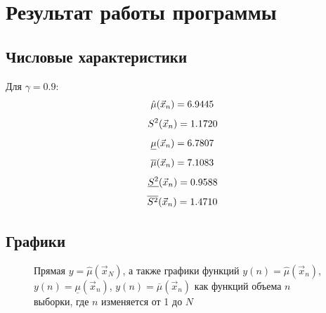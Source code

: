 \section{Результат работы программы}

\subsection{Числовые характеристики}
Для $\gamma = 0.9$:
\begin{equation*}
	\hat\mu(\vec x_n) = 6.9445\\
\end{equation*}
\begin{equation*}
	S^2(\vec x_n) = 1.1720\\
\end{equation*}
\begin{equation*}
	\underline\mu(\vec x_n) = 6.7807\\
\end{equation*}
\begin{equation*}
	\overline\mu(\vec x_n) = 7.1083 \\
\end{equation*}
\begin{equation*}
	\underline{S^2}(\vec x_n) = 0.9588\\
\end{equation*}
\begin{equation*}
	\overline{S^2}(\vec x_n) = 1.4710\\
\end{equation*}

\newpage

\subsection{Графики}

\begin{figure}[!h]
 \caption{Прямая $y = \hat\mu(\vec x_N)$, а также графики функций  $y(n) = \hat\mu(\vec x_n)$, $y(n) = \underline\mu(\vec x_n)$, $y(n) = \overline\mu(\vec x_n)$ как функций объема $n$ выборки, где $n$ изменяется от 1 до $N$}
\end{figure}

